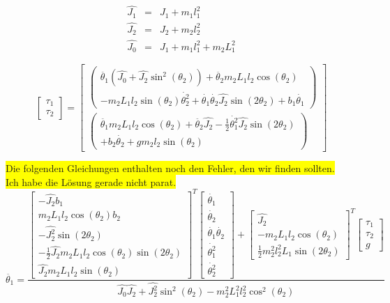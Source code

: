 \begin{eqnarray}
\hat{J_1} &=& J_1 + m_1l^2_1	\nonumber	\\
\hat{J_2} &=& J_2 + m_2l^2_2	\nonumber	\\
\hat{J_0} &=& J_1 + m_1l^2_1 + m_2L^2_1
\end{eqnarray}

\begin{equation}
\begin{bmatrix}
\tau_1 \\
\tau_2
\end{bmatrix}
=
\begin{bmatrix}
\begin{pmatrix}
\ddot{\theta_1}(\hat{J_0}+\hat{J_2}\sin^2(\theta_2))+\ddot{\theta_2}m_2L_1l_2\cos(\theta_2)			\\
-m_2L_1l_2\sin(\theta_2)\dot{\theta^2_2}+\dot{\theta_1}\dot{\theta_2}\hat{J_2}\sin(2\theta_2)+b_1\dot{\theta_1}
\end{pmatrix}
\\
\begin{pmatrix}
\ddot{\theta_1}m_2L_1l_2\cos(\theta_2)+\ddot{\theta_2}\hat{J_2}-\frac{1}{2}\dot{\theta^2_1}\hat{J_2}\sin(2\theta_2)						\\
+b_2\dot{\theta_2}+gm_2l_2\sin(\theta_2)
\end{pmatrix}
\end{bmatrix}
\end{equation}


\colorbox{yellow}{Die folgenden Gleichungen enthalten noch den Fehler, den wir finden sollten.} \\
\colorbox{yellow}{Ich habe die Lösung gerade nicht parat.}
\begin{equation}
\ddot{\theta_1} =
\frac{
\begin{bmatrix}
-\hat{J_2}b_1 \\ 
m_2L_1l_2\cos(\theta_2)b_2 \\ 
-\hat{J^2_2}\sin(2\theta_2) \\ 
-\frac{1}{2}\hat{J_2}m_2L_1l_2\cos(\theta_2)\sin(2\theta_2) \\ 
\hat{J_2}m_2L_1l_2\sin(\theta_2)
\end{bmatrix}^T
\begin{bmatrix}
\dot{\theta_1} \\ 
\dot{\theta_2} \\ 
\dot{\theta_1}\dot{\theta_2} \\ 
\dot{\theta^2_1} \\ 
\dot{\theta^2_2}
\end{bmatrix}
+
\begin{bmatrix}
\hat{J_2} \\ 
-m_2L_1l_2\cos(\theta_2) \\ 
\frac{1}{2}m^2_2l^2_2L_1\sin(2\theta_2)
\end{bmatrix}^T
\begin{bmatrix}
\tau_1 \\ 
\tau_2 \\ 
g
\end{bmatrix} }
{\hat{J_0}\hat{J_2}+\hat{J^2_2}\sin^2(\theta_2)-m^2_2L^2_1l^2_2\cos^2(\theta_2)}
\end{equation}



